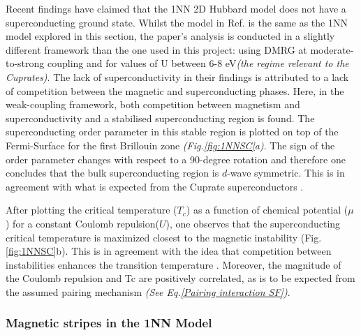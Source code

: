 \documentclass[12pt]{article}
\begin{document}
\noindent Recent findings have claimed that the 1NN 2D Hubbard model does not have a superconducting ground state\cite{qin2020absence}. 
Whilst the model in Ref. \cite{qin2020absence} is the same as the 1NN model explored in this section, the paper's analysis is conducted in a 
slightly different framework than the one used in this project: using DMRG \cite{white1992density} 
at moderate-to-strong coupling and for values of U between 6-8 eV\textit{(the 
regime relevant to the Cuprates)}.
The lack of superconductivity in their findings is attributed to a lack of competition 
between the magnetic and superconducting phases. Here, in the weak-coupling framework, both  competition between magnetism and superconductivity and 
a stabilised superconducting region is found. The superconducting order parameter in this stable region is plotted on top of the Fermi-Surface for the first Brillouin zone \textit{(Fig.\ref{fig:1NNSC}a)}.
The sign of the order parameter changes with respect to a 90-degree rotation and therefore one concludes that
the bulk superconducting region is $d$-wave symmetric. This is in agreement with what is expected from the Cuprate superconductors \cite{tsuei2000pairing}.\par
\medskip
\noindent 
After plotting the critical temperature ($T_c$) as a function of chemical potential ($\mu$) for a constant Coulomb repulsion($U$), one observes that
the superconducting critical temperature is maximized closest to the magnetic instability (Fig.\ref{fig:1NNSC}b).
This is in agreement with the idea that competition between instabilities
enhances the transition temperature \cite{maple1995interplay,sun2016dome}. Moreover, the magnitude of the Coulomb repulsion and Tc are positively correlated, as is to be expected from the assumed 
pairing mechanism \textit{(See Eq.\ref{Pairing interaction SF})}.





\subsubsection{Magnetic stripes in the 1NN Model}
\label{subsec:Stripes1NN}
\end{document}
